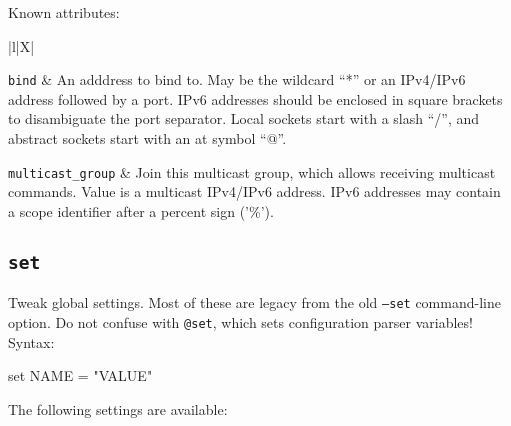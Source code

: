 \documentclass[a4paper,12pt]{article}
\begin{document}
Known attributes:

\begin{longtabu*}{|l|X|}\hline

\verb|bind| & An adddress to bind to.  May be the wildcard ``*'' or an
IPv4/IPv6 address followed by a port.  IPv6 addresses should be
enclosed in square brackets to disambiguate the port separator.  Local
sockets start with a slash ``/'', and abstract sockets start with an
at symbol ``@''. \\\hline

\verb|multicast_group| & Join this multicast group, which allows
receiving multicast commands.  Value is a multicast IPv4/IPv6
address.  IPv6 addresses may contain a scope identifier after a
percent sign ('\%'). \\\hline

\end{longtabu*}

\subsection{\texttt{set}}

Tweak global settings.  Most of these are legacy from the old
\texttt{--set} command-line option.  Do not confuse with
\texttt{@set}, which sets configuration parser variables!  Syntax:

\begin{verbatim*}
set NAME = "VALUE"
\end{verbatim*}

The following settings are available:
\end{document}
